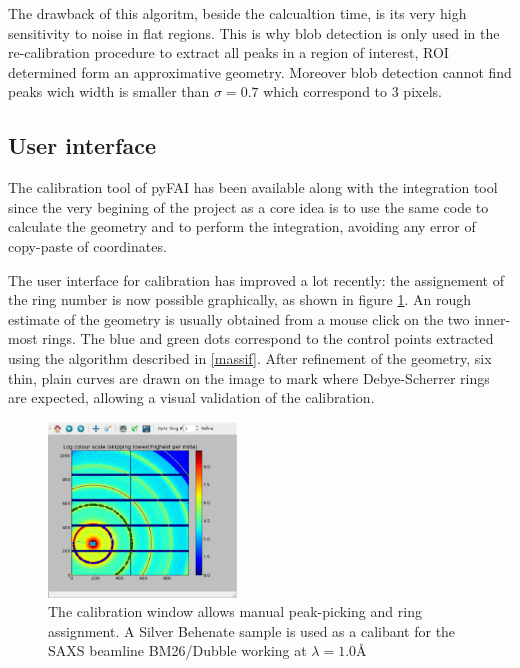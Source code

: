 \documentclass[preprint]{iucr}
\begin{document}
The drawback of this algoritm, beside the calcualtion time, is its very high
sensitivity to noise in flat regions. 
This is why blob detection is only used in the re-calibration procedure to
extract all peaks in a region of interest, ROI determined form an
approximative geometry.
Moreover blob detection cannot find peaks wich width is smaller than  
$\sigma=0.7$ which correspond to 3 pixels.

\subsection{User interface}
The calibration tool of pyFAI has been available along with the
integration tool since the very begining of the project as a core idea is to
use the same code to calculate the geometry and to perform the integration,
avoiding any error of copy-paste of coordinates.

The user interface for calibration has improved a lot recently: the assignement
of the ring number is now possible graphically, as shown in figure \ref{calib}.
An rough estimate of the geometry is usually obtained from a mouse click on the
two inner-most rings. 
The blue and green dots correspond to the control points extracted using the
algorithm described in \ref{massif}. 
After refinement of the geometry, six thin, plain curves are drawn on the
image to mark where Debye-Scherrer rings are expected, allowing a visual
validation of the calibration.

\begin{figure}
\label{calib}
\begin{center}
\includegraphics[width=5cm]{calib.eps}
\caption{The calibration window allows manual peak-picking and
ring assignment. A Silver Behenate sample is used as a calibant for the SAXS
beamline BM26/Dubble working at $\lambda=1.0${\AA}}
\end{center}
\end{figure}
\end{document}
